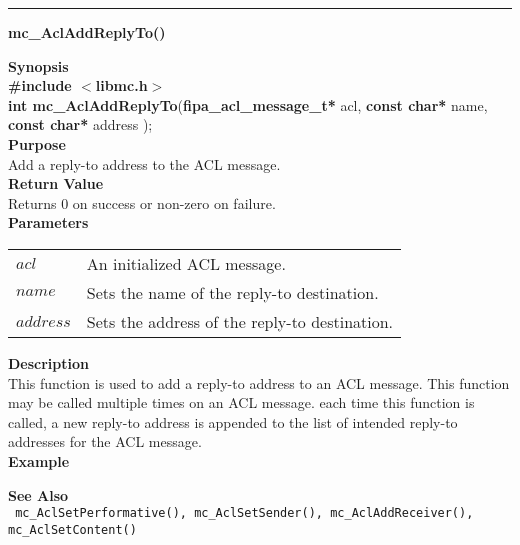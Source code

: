 \noindent
\vspace{5pt}
\rule{6.5in}{0.015in}
\noindent
{}
{\LARGE \bf mc\_AclAddReplyTo()}\\
\label{api:mc_Acl_AddReplyTo()}

\noindent
{\bf Synopsis}\\
{\bf \#include $<$libmc.h$>$}\\
{\bf int mc\_AclAddReplyTo}({\bf fipa\_acl\_message\_t*} acl, {\bf const char*} name, {\bf const char*} address );\\

\noindent
{\bf Purpose}\\
Add a reply-to address to the ACL message.\\

\noindent
{\bf Return Value}\\
Returns 0 on success or non-zero on failure. \\

\noindent
{\bf Parameters}
\vspace{-0.1in}
\begin{description}
\item
\begin{tabular}{p{10 mm}p{145 mm}} 
$acl$ & An initialized ACL message. \\
$name$ & Sets the name of the reply-to destination. \\
$address$ & Sets the address of the reply-to destination. 
\end{tabular}
\end{description}

\noindent
{\bf Description}\\
This function is used to add a reply-to address to an ACL message. This function 
may be called multiple times on an ACL message. each time this function is 
called, a new reply-to address is appended to the list of intended reply-to
addresses for the ACL message. \\

\noindent
{\bf Example}\\
\noindent
{\footnotesize}

\noindent
{\bf See Also}\\
\texttt{
  mc\_AclSetPerformative(), mc\_AclSetSender(), mc\_AclAddReceiver(), 
    \linebreak mc\_AclSetContent()
}

